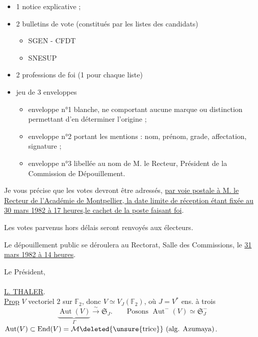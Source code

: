 \begin{itemize}[label={-}]
\item 1 notice explicative ;
\item 2 bulletins de vote (constitués par les listes des candidats)
\begin{itemize}[label={.}]
\item SGEN - CFDT
\item SNESUP
\end{itemize}
\item 2 professions de foi (1 pour chaque liste)
\item jeu de 3 enveloppes
\begin{itemize}[label={.}]
\item enveloppe n°1 blanche, ne comportant aucune marque ou distinction permettant d'en déterminer l'origine ;
\item enveloppe n°2 portant les mentions : nom, prénom, grade, affectation, signature ;
\item enveloppe n°3 libellée au nom de M. le Recteur, Président de la Commission de Dépouillement.
\end{itemize}
\end{itemize}

Je vous précise que les votes devront être adressés, \uline{par voie postale à M. le Recteur de l'Académie de Montpellier, la date limite de réception étant fixée au 30 mars 1982 à 17 heures,le cachet de la poste faisant foi}.

Les votes parvenus hors délais seront renvoyés aux électeurs.

Le dépouillement public se déroulera au Rectorat, Salle des Commissions, le \uline{31 mars 1982 à 14 heures}.

Le Président,\\
\\
\uline{L. THALER}.\\

\uline{Prop} \(V\) vectoriel   \(2\) sur \(\mathbb F_2\), donc \(V\simeq V_J(\mathbb F_2)\), où \(J=V^*\) ens. à trois 
\[
\underbrace{\operatorname{Aut}(V)}_{\Gamma}\xrightarrow{\sim}\mathfrak S_J.
\qquad\text{Posons }\operatorname{Aut}^{-}(V)\simeq\mathfrak S_J^{-}
\]
 \(\operatorname{Aut}(V)\subset\operatorname{End}(V)=\mathcal M\deleted{\unsure{\mathrm{trice}}}\ \text{(alg. Azumaya})\).

